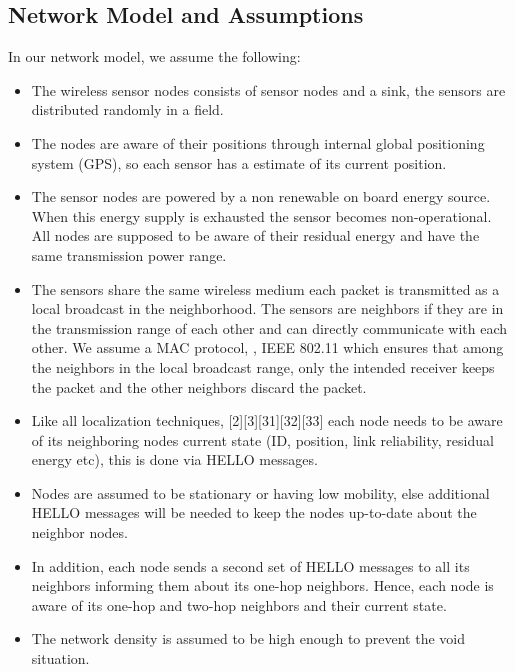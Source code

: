 \documentclass[fleqn,twoside]{article}
\begin{document}
\subsection{Network Model and Assumptions}
In our network model, we assume the following:
\begin{itemize}
  \item The wireless sensor nodes consists of  sensor nodes and a sink, the sensors are distributed randomly in a field.
  \item The nodes are aware of their positions through internal global positioning system (GPS), so each sensor has a estimate of its current position.
  \item The  sensor nodes are powered by a non renewable on board energy source. When this energy supply is exhausted the sensor becomes non-operational. All 
  nodes are supposed to be aware of their residual energy and have the same transmission power range.
  \item The sensors share the same wireless medium each packet is transmitted as a local broadcast in the neighborhood. The sensors are neighbors if they are in
  the transmission range of each other and can directly communicate with each other. We assume a MAC protocol, , IEEE 802.11 which ensures that among
  the neighbors in the local broadcast range, only the intended receiver keeps the packet and the other neighbors discard the packet.
  \item Like all localization techniques, [2][3][31][32][33] each node needs to be aware of its 
  neighboring nodes current state (ID, position, link reliability, residual energy etc), this is done via HELLO messages. 
  \item Nodes are assumed to be stationary or having low mobility, else additional HELLO messages will be needed
  to keep the nodes up-to-date about the neighbor nodes.
  \item In addition, each node sends a second set of HELLO messages to all its neighbors informing them about its one-hop neighbors. 
  Hence, each node is aware of its one-hop and two-hop neighbors and their current state.
  \item The network density is assumed to be high enough to prevent the void situation.
\end{itemize}
\end{document}
